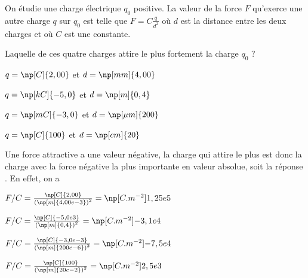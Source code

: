 \debutEntrainement


\begin{enonce}
	On étudie une charge électrique $q_0$ positive. La valeur de la force $F$ qu'exerce une autre charge $q$ sur $q_0$ est telle que $F = C \frac{q}{d^2}$ où $d$ est la distance entre les deux charges et où $C$ est une constante.

	Laquelle de ces quatre charges attire le plus fortement la charge $q_0$ ?
	
	\begin{listeQCM2Colonnes}
	\item $q = \np[C]{2,00}$ et $ d = \np[mm]{4,00}$
	\item $q = \np[kC]{-5,0}$ et $ d = \np[m]{0,4}$
	\item $q = \np[mC]{-3,0}$ et $ d = \np[\mu m]{200}$
	\item $q = \np[C]{100}$ et $ d = \np[cm]{20}$
	\end{listeQCM2Colonnes}

	\bigskip

	\vphantom{Calculer}
\end{enonce}

\reponse{ \reponseC{}}

\begin{corrige}
	Une force attractive a une valeur négative, la charge qui attire le plus est donc la charge avec la force négative la plus importante en valeur absolue, soit la réponse \reponseC{}. En effet, on a

	\begin{listeQCM2Colonnes}
		\item $F/C = \frac{ \np[C]{2,00} }{\left(\np[m]{4,00e{-3}}\right)^2} = \np[C.m^{-2}]{1,25e{5}}$
		\item $F/C = \frac{ \np[C]{-5,0e{3}} }{\left(\np[m]{0,4}\right)^2} = \np[C.m^{-2}]{-3,1e{4}}$
		\item $F/C = \frac{ \np[C]{-3,0e{-3}} }{\left(\np[m]{200e{-6}}\right)^2} = \np[C.m^{-2}]{-7,5e{4}}$
		\item $F/C = \frac{ \np[C]{100} }{\left(\np[m]{20e{-2}}\right)^2} = \np[C.m^{-2}]{2,5e{3}}$
	\end{listeQCM2Colonnes}

\end{corrige}

